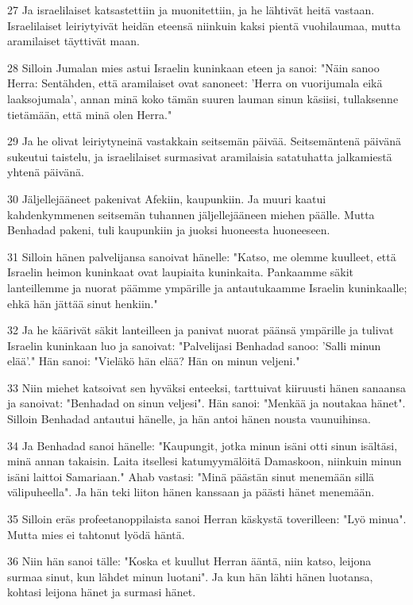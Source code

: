 \par 27 Ja israelilaiset katsastettiin ja muonitettiin, ja he lähtivät heitä vastaan. Israelilaiset leiriytyivät heidän eteensä niinkuin kaksi pientä vuohilaumaa, mutta aramilaiset täyttivät maan.
\par 28 Silloin Jumalan mies astui Israelin kuninkaan eteen ja sanoi: "Näin sanoo Herra: Sentähden, että aramilaiset ovat sanoneet: 'Herra on vuorijumala eikä laaksojumala', annan minä koko tämän suuren lauman sinun käsiisi, tullaksenne tietämään, että minä olen Herra."
\par 29 Ja he olivat leiriytyneinä vastakkain seitsemän päivää. Seitsemäntenä päivänä sukeutui taistelu, ja israelilaiset surmasivat aramilaisia satatuhatta jalkamiestä yhtenä päivänä.
\par 30 Jäljellejääneet pakenivat Afekiin, kaupunkiin. Ja muuri kaatui kahdenkymmenen seitsemän tuhannen jäljellejääneen miehen päälle. Mutta Benhadad pakeni, tuli kaupunkiin ja juoksi huoneesta huoneeseen.
\par 31 Silloin hänen palvelijansa sanoivat hänelle: "Katso, me olemme kuulleet, että Israelin heimon kuninkaat ovat laupiaita kuninkaita. Pankaamme säkit lanteillemme ja nuorat päämme ympärille ja antautukaamme Israelin kuninkaalle; ehkä hän jättää sinut henkiin."
\par 32 Ja he käärivät säkit lanteilleen ja panivat nuorat päänsä ympärille ja tulivat Israelin kuninkaan luo ja sanoivat: "Palvelijasi Benhadad sanoo: 'Salli minun elää'." Hän sanoi: "Vieläkö hän elää? Hän on minun veljeni."
\par 33 Niin miehet katsoivat sen hyväksi enteeksi, tarttuivat kiiruusti hänen sanaansa ja sanoivat: "Benhadad on sinun veljesi". Hän sanoi: "Menkää ja noutakaa hänet". Silloin Benhadad antautui hänelle, ja hän antoi hänen nousta vaunuihinsa.
\par 34 Ja Benhadad sanoi hänelle: "Kaupungit, jotka minun isäni otti sinun isältäsi, minä annan takaisin. Laita itsellesi katumyymälöitä Damaskoon, niinkuin minun isäni laittoi Samariaan." Ahab vastasi: "Minä päästän sinut menemään sillä välipuheella". Ja hän teki liiton hänen kanssaan ja päästi hänet menemään.
\par 35 Silloin eräs profeetanoppilaista sanoi Herran käskystä toverilleen: "Lyö minua". Mutta mies ei tahtonut lyödä häntä.
\par 36 Niin hän sanoi tälle: "Koska et kuullut Herran ääntä, niin katso, leijona surmaa sinut, kun lähdet minun luotani". Ja kun hän lähti hänen luotansa, kohtasi leijona hänet ja surmasi hänet.
